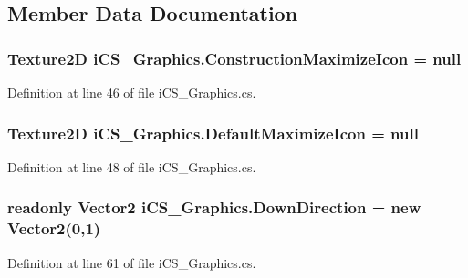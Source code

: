 \subsection{Member Data Documentation}
\hypertarget{classi_c_s___graphics_ad96be9bcb78a8bdae14e6f3b4c9f6b0f}{
\subsubsection[{Construction\+Maximize\+Icon}]{\setlength{\rightskip}{0pt plus 5cm}Texture2\+D i\+C\+S\+\_\+\+Graphics.\+Construction\+Maximize\+Icon = null}}\label{classi_c_s___graphics_ad96be9bcb78a8bdae14e6f3b4c9f6b0f}


Definition at line 46 of file i\+C\+S\+\_\+\+Graphics.\+cs.

\hypertarget{classi_c_s___graphics_a6c45a2ac7a92047f71e8c95d160f7fd7}{
\subsubsection[{Default\+Maximize\+Icon}]{\setlength{\rightskip}{0pt plus 5cm}Texture2\+D i\+C\+S\+\_\+\+Graphics.\+Default\+Maximize\+Icon = null}}\label{classi_c_s___graphics_a6c45a2ac7a92047f71e8c95d160f7fd7}


Definition at line 48 of file i\+C\+S\+\_\+\+Graphics.\+cs.

\hypertarget{classi_c_s___graphics_a18251945bc69eb351fd9a2e3e6b67b9a}{
\subsubsection[{Down\+Direction}]{\setlength{\rightskip}{0pt plus 5cm}readonly Vector2 i\+C\+S\+\_\+\+Graphics.\+Down\+Direction = new Vector2(0,1)\hspace{0.3cm}{\ttfamily [static]}}}\label{classi_c_s___graphics_a18251945bc69eb351fd9a2e3e6b67b9a}


Definition at line 61 of file i\+C\+S\+\_\+\+Graphics.\+cs.

